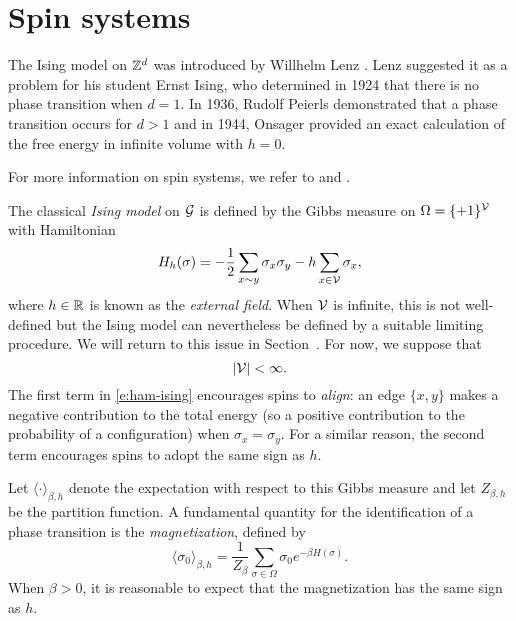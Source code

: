 

\section{Spin systems}

The Ising model on ${ {{\mathbb Z}}^d }$ was introduced by Willhelm Lenz \REF. Lenz
suggested it as
a problem for his student Ernst Ising, who determined in 1924 \cite{Ising25} that there is no
phase transition when $d = 1$.
In 1936, Rudolf Peierls \cite{Peierls36} demonstrated that a phase
transition occurs for $d > 1$ and in 1944, Onsager \cite{Onsager44} provided an exact calculation
of the free energy in infinite volume with $h = 0$.


For more information on spin systems, we refer to \cite{Georgii11} and .


The classical \emph{Ising model} on $\mathcal{G}$ is defined by the Gibbs measure on
$\Omega = \{ + 1 \}^{\mathcal{V}}$ with Hamiltonian
\begin{equation}
\label{e:ham-ising}
H_h(\sigma)
	=
-\frac{1}{2} \sum_{x \sim y} \sigma_x \sigma_y - h \sum_{x\in\mathcal{V}} \sigma_x,
\end{equation}
where $h \in {\mathbb R}$ is known as the \emph{external field}. When $\mathcal{V}$ is
infinite, this is not well-defined but the Ising model can nevertheless be
defined by a suitable limiting procedure. We will return to this issue in
Section~\REF. For now, we suppose that
\begin{equation}
|\mathcal{V}| < \infty.
\end{equation}
The first term in \eqref{e:ham-ising} encourages spins to \emph{align}: an edge
$\{ x, y \}$ makes
a negative contribution to the total energy (so a positive contribution to
the probability of a configuration) when $\sigma_x = \sigma_y$.
For a similar reason, the second term encourages spins to adopt the same sign as $h$.

Let $\langle\cdot\rangle_{\beta,h}$ denote the expectation with respect to
this Gibbs measure and let $Z_{\beta,h}$ be the partition function.
A fundamental quantity for the identification of a phase transition is the
\emph{magnetization}, defined by
\begin{equation}
\langle \sigma_0 \rangle_{\beta,h} = \frac{1}{Z_\beta} \sum_{\sigma\in\Omega} \sigma_0 e^{-\beta H(\sigma)}.
\end{equation}
When $\beta > 0$, it is reasonable to expect that the magnetization has the
same sign as $h$.

